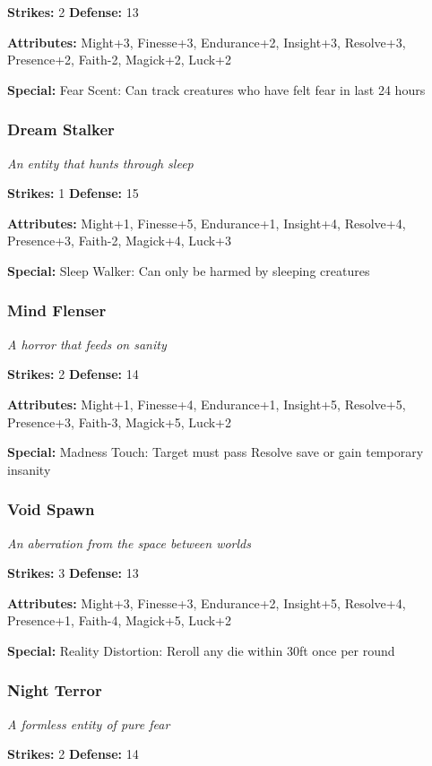 \documentclass[10pt,twoside]{article}
\begin{document}
\textbf{Strikes:} 2 \quad \textbf{Defense:} 13

\textbf{Attributes:} Might+3, Finesse+3, Endurance+2, Insight+3, Resolve+3, Presence+2, Faith-2, Magick+2, Luck+2

\textbf{Special:} Fear Scent: Can track creatures who have felt fear in last 24 hours

\subsubsection{Dream Stalker}
\textit{An entity that hunts through sleep}

\textbf{Strikes:} 1 \quad \textbf{Defense:} 15

\textbf{Attributes:} Might+1, Finesse+5, Endurance+1, Insight+4, Resolve+4, Presence+3, Faith-2, Magick+4, Luck+3

\textbf{Special:} Sleep Walker: Can only be harmed by sleeping creatures

\subsubsection{Mind Flenser}
\textit{A horror that feeds on sanity}

\textbf{Strikes:} 2 \quad \textbf{Defense:} 14

\textbf{Attributes:} Might+1, Finesse+4, Endurance+1, Insight+5, Resolve+5, Presence+3, Faith-3, Magick+5, Luck+2

\textbf{Special:} Madness Touch: Target must pass Resolve save or gain temporary insanity

\subsubsection{Void Spawn}
\textit{An aberration from the space between worlds}

\textbf{Strikes:} 3 \quad \textbf{Defense:} 13

\textbf{Attributes:} Might+3, Finesse+3, Endurance+2, Insight+5, Resolve+4, Presence+1, Faith-4, Magick+5, Luck+2

\textbf{Special:} Reality Distortion: Reroll any die within 30ft once per round

\subsubsection{Night Terror}
\textit{A formless entity of pure fear}

\textbf{Strikes:} 2 \quad \textbf{Defense:} 14
\end{document}
